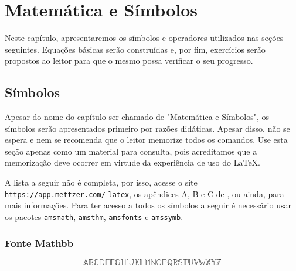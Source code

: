 %
%
%
\chapter{Matem\'atica e S\'imbolos}
\label{intro} %

Neste cap\'{i}tulo, apresentaremos os s\'{i}mbolos e operadores utilizados nas seções seguintes. Equações b\'{a}sicas serão constru\'{i}das e, por fim, exerc\'{i}cios serão propostos ao leitor para que o mesmo possa verificar o seu progresso.

\section{S\'{i}mbolos}
\label{sec:1}
Apesar do nome do cap\'{i}tulo ser chamado de "Matem\'{a}tica e S\'{i}mbolos", os s\'{i}mbolos ser\~{a}o apresentados primeiro por raz\~{o}es did\'{a}ticas. Apesar disso, n\~{a}o se espera e nem se recomenda que o leitor memorize todos os comandos. Use esta seç\~{a}o apenas como um material para consulta, pois acreditamos que a memorizaç\~{a}o deve ocorrer em virtude da experi\^{e}ncia de uso do \LaTeX.

\noindent A lista a seguir n\~{a}o \'{e} completa, por isso, acesse o site \verb|https://app.mettzer.com/| \verb|latex|, os ap\^{e}ndices A, B e C de \cite{gratzer2007more}, ou ainda, \cite{downes2002short} para mais informaç\~{o}es. Para ter acesso a todos os s\'imbolos a seguir é necess\'ario usar os pacotes \verb|amsmath|, \verb|amsthm|, \verb|amsfonts| e \verb|amssymb|. 

\subsection{Fonte Mathbb}
\begin{equation*}
    \mathbb{A}\mathbb{B}\mathbb{C}\mathbb{D}\mathbb{E}\mathbb{F}\mathbb{G}\mathbb{H}\mathbb{I}\mathbb{J}\mathbb{K}\mathbb{L}\mathbb{M}\mathbb{N}\mathbb{O}\mathbb{P}\mathbb{Q}\mathbb{R}\mathbb{S}\mathbb{T}\mathbb{U}\mathbb{V}\mathbb{W}\mathbb{X}\mathbb{Y}\mathbb{Z}
\end{equation*}

